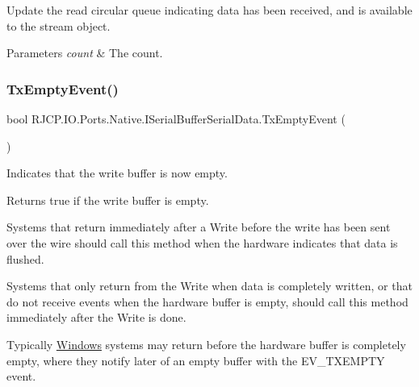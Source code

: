 Update the read circular queue indicating data has been received, and is available to the stream object. 


\begin{DoxyParams}{Parameters}
{\em count} & The count.\\
\hline
\end{DoxyParams}
\mbox{\label{interface_r_j_c_p_1_1_i_o_1_1_ports_1_1_native_1_1_i_serial_buffer_serial_data_a657802355ea0d81eb1938af0cb2927c8}} 
\subsubsection{\texorpdfstring{TxEmptyEvent()}{TxEmptyEvent()}}
{\footnotesize\ttfamily bool R\+J\+C\+P.\+I\+O.\+Ports.\+Native.\+I\+Serial\+Buffer\+Serial\+Data.\+Tx\+Empty\+Event (\begin{DoxyParamCaption}{ }\end{DoxyParamCaption})}



Indicates that the write buffer is now empty. 

\begin{DoxyReturn}{Returns}
{\ttfamily true} if the write buffer is empty.
\end{DoxyReturn}


Systems that return immediately after a Write before the write has been sent over the wire should call this method when the hardware indicates that data is flushed. 

Systems that only return from the Write when data is completely written, or that do not receive events when the hardware buffer is empty, should call this method immediately after the Write is done.

Typically \mbox{\hyperlink{namespace_r_j_c_p_1_1_i_o_1_1_ports_1_1_native_1_1_windows}{Windows}} systems may return before the hardware buffer is completely empty, where they notify later of an empty buffer with the E\+V\+\_\+\+T\+X\+E\+M\+P\+TY event.\mbox{\label{interface_r_j_c_p_1_1_i_o_1_1_ports_1_1_native_1_1_i_serial_buffer_serial_data_a311167fad010dfdfb43433e7980f96b9}} 
